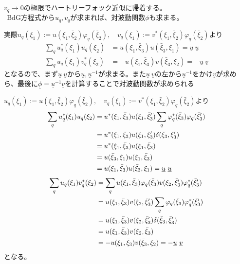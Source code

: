 \documentclass[dvipdfmx, 11pt, a4paper]{jsarticle}
\numberwithin{equation}{section}
\theoremstyle{definition}
\begin{document}
    $v_q\rightarrow 0$の極限でハートリーフォック近似に帰着する。\\
    $\ \ $BdG方程式から$u_q,v_q$が求まれば、対波動関数$\phi$も求まる。
    \begin{note}[]
        実際$u_q(\xi_1) := u(\xi_1,\bar{\xi}_2)\varphi_q(\bar{\xi}_2),\quad v_q(\xi_1) := v^*(\xi_1,\bar{\xi}_2)\varphi_q(\bar{\xi}_2)$より
        \begin{align}
            \sum_q u^*_q(\xi_1)u_q(\xi_2) &= u(\xi_1,\bar{\xi}_3)u(\bar{\xi}_3,\xi_1) =\underline{u}\ \underline{u} 
                \label{UVMoto} \\
                \sum_qu_q(\xi_1)v_q^*(\xi_2) &= -u(\xi_1,\bar{\xi}_3)v(\bar{\xi}_3,\xi_2) = -\underline{u}\ \underline{v} 
        \end{align}
        となるので、まず$\underline{u}\ \underline{u} $から$\underline{u}, \underline{u}^{-1}$が求まる。また$\underline{u}\ \underline{v}$の左から$\underline{u}^{-1}$をかけ$\underline{v}$が求めら、最後に$\underline{\phi} = \underline{u}^{-1}\underline{v}$を計算することで対波動関数が求められる
    \end{note}
    \begin{derivationBox}
        $u_q(\xi_1) := u(\xi_1,\bar{\xi}_2)\varphi_q(\bar{\xi}_2),\quad v_q(\xi_1) := v^*(\xi_1,\bar{\xi}_2)\varphi_q(\bar{\xi}_2)$より
        \begin{align}
            \sum_q u^*_q(\xi_1)u_q(\xi_2) &= u^*(\xi_1,\bar{\xi}_3)u(\xi_1,\bar{\xi}_3')\sum_q \varphi_q^*(\bar{\xi}_3)\varphi_q(\bar{\xi}_3') \notag \\
            &= u^*(\xi_1,\bar{\xi}_3)u(\xi_1,\bar{\xi}_3')\delta(\bar{\xi}_3,\bar{\xi}_3') \notag \\
            &= u^*(\xi_1,\bar{\xi}_3)u(\xi_1,\bar{\xi}_3) \notag \\
            &=u(\bar{\xi}_3,\xi_1)u(\xi_1,\bar{\xi}_3) \notag \\
            &= u(\xi_1,\bar{\xi}_3)u(\bar{\xi}_3,\xi_1) =\underline{u}\ \underline{u} 
        \end{align}
        \begin{align}
            \sum_qu_q(\xi_1)v_q^*(\xi_2) &= \sum_qu(\xi_1,\bar{\xi}_3)\varphi_q(\bar{\xi}_3)v(\xi_2,\bar{\xi}_3')\varphi_q^*(\bar{\xi}_3') \notag \\
            &= u(\xi_1,\bar{\xi}_3)v(\xi_2,\bar{\xi}_3')\sum_q\varphi_q(\bar{\xi}_3)\varphi_q^*(\bar{\xi}_3') \notag \\
            &= u(\xi_1,\bar{\xi}_3)v(\xi_2,\bar{\xi}_3')\delta(\bar{\xi}_3,\bar{\xi}_3') \notag \\
            &= u(\xi_1,\bar{\xi}_3)v(\xi_2,\bar{\xi}_3) \notag \\
            &= -u(\xi_1,\bar{\xi}_3)v(\bar{\xi}_3,\xi_2) = -\underline{u}\ \underline{v}
        \end{align}
        となる。
    \end{derivationBox}
\end{document}
